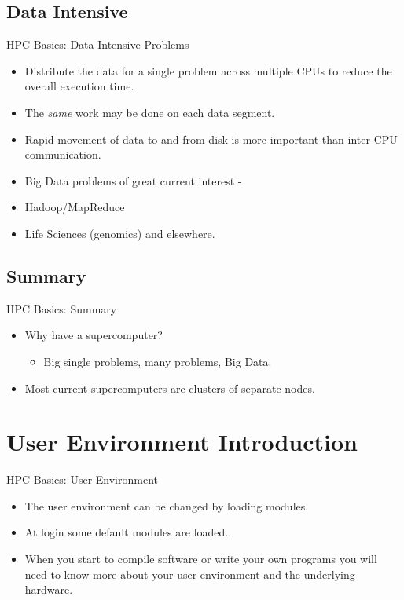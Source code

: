 \subsection{Data Intensive}
\begin{frame}{HPC Basics: Data Intensive Problems}
\begin{itemize}
\item{Distribute the \alert{data} for a \alert{single problem} across multiple CPUs to reduce the overall execution time.}
\pause
\item{The \emph{same} work may be done on each data segment.}
\pause
\item{Rapid movement of data to and from disk is more important than inter-CPU communication.}
\pause
\item{\alert{Big Data} problems of great current interest -}
\item{Hadoop/MapReduce}
\item{Life Sciences (genomics) and elsewhere.}
\end{itemize}
\end{frame}

\subsection*{Summary}
\begin{frame}{HPC Basics: Summary}
  \begin{itemize}
  \item<1->{\alert{Why have a supercomputer?}}
  \begin{itemize}\item<2->{Big single problems, many problems, Big Data.}\end{itemize}
  \item<3->{Most current supercomputers are \alert{clusters} of separate \alert{nodes}.}
  \end{itemize}
  
\end{frame}

\section{User Environment Introduction}
\begin{frame}{HPC Basics: User Environment}
\begin{itemize}
\item{The user environment can be changed by loading modules.}
\item{At login some default modules are loaded.}
\item{When you start to compile software or write your own programs you will need to know more about your user environment and the underlying hardware.}
\end{itemize}
\end{frame}

